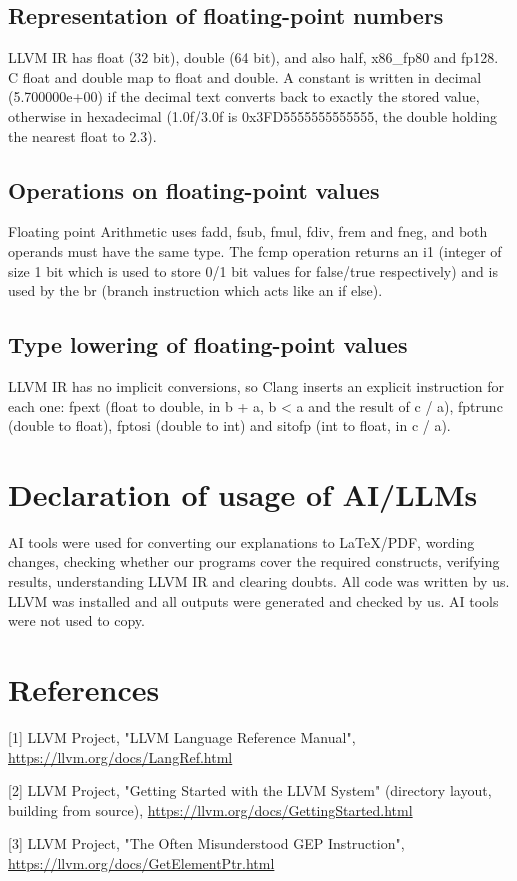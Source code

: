 \documentclass[11pt,a4paper]{article}
\begin{document}
\subsection{Representation of floating-point numbers}

LLVM IR has float (32 bit), double (64 bit), and also half, x86\_fp80 and fp128. C float and double map to float and double. A constant is written in decimal (5.700000e+00) if the decimal text converts back to exactly the stored value, otherwise in hexadecimal (1.0f/3.0f is 0x3FD5555555555555, the double holding the nearest float to 2.3).

\subsection{Operations on floating-point values}

Floating point Arithmetic uses fadd, fsub, fmul, fdiv, frem and fneg, and both operands must have the same type. The fcmp operation returns an i1 (integer of size 1 bit which is used to store 0/1 bit values for false/true respectively) and is used by the br (branch instruction which acts like an if else).

\subsection{Type lowering of floating-point values}

LLVM IR has no implicit conversions, so Clang inserts an explicit instruction for each one: fpext (float to double, in b + a, b < a and the result of c / a), fptrunc (double to float), fptosi (double to int) and sitofp (int to float, in c / a).

\section*{Declaration of usage of AI/LLMs}

AI tools were used for converting our explanations to LaTeX/PDF, wording changes, checking whether our programs cover the required constructs, verifying results, understanding LLVM IR and clearing doubts. All code was written by us. LLVM was installed and all outputs were generated and checked by us. AI tools were not used to copy.

\section*{References}

[1] LLVM Project, "LLVM Language Reference Manual", \url{https://llvm.org/docs/LangRef.html}


[2] LLVM Project, "Getting Started with the LLVM System" (directory layout, building from source), \url{https://llvm.org/docs/GettingStarted.html}


[3] LLVM Project, "The Often Misunderstood GEP Instruction", \url{https://llvm.org/docs/GetElementPtr.html}
\end{document}

